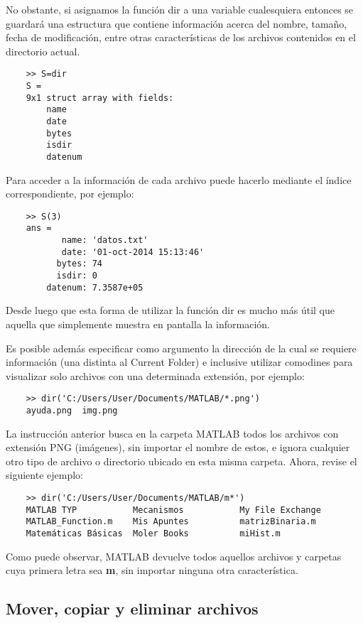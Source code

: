 No obstante, si asignamos la función dir a una variable cualesquiera entonces se 
guardará una estructura que contiene información acerca del nombre, tamaño, fecha 
de modificación, entre otras características de los archivos contenidos en el 
directorio actual.

\begin{verbatim}
	>> S=dir
	S = 
	9x1 struct array with fields:
	    name
	    date
	    bytes
	    isdir
	    datenum
\end{verbatim}

Para acceder a la información de cada archivo puede hacerlo mediante el índice 
correspondiente, por ejemplo:

\begin{verbatim}
	>> S(3)
	ans = 
	       name: 'datos.txt'
	       date: '01-oct-2014 15:13:46'
	      bytes: 74
	      isdir: 0
	    datenum: 7.3587e+05
\end{verbatim}

Desde luego que esta forma de utilizar la función dir es mucho más útil que aquella 
que simplemente muestra en pantalla la información.

Es posible además especificar como argumento la dirección de la cual se requiere 
información (una distinta al Current Folder) e inclusive utilizar comodines para 
visualizar solo archivos con una determinada extensión, por ejemplo:

\begin{verbatim}
   	>> dir('C:/Users/User/Documents/MATLAB/*.png')
	ayuda.png  img.png 
\end{verbatim}   

La instrucción anterior busca en la carpeta MATLAB todos los archivos con 
extensión PNG (imágenes), sin importar el nombre de estos, e ignora cualquier 
otro tipo de archivo o directorio ubicado en esta misma carpeta. Ahora, 
revise el siguiente ejemplo:

\begin{verbatim}
	>> dir('C:/Users/User/Documents/MATLAB/m*')
	MATLAB TYP           Mecanismos           My File Exchange     
	MATLAB_Function.m    Mis Apuntes          matrizBinaria.m      
	Matemáticas Básicas  Moler Books          miHist.m       
\end{verbatim}

Como puede observar, MATLAB devuelve todos aquellos archivos y carpetas cuya 
primera letra sea \textbf{m}, sin importar ninguna otra característica.

\subsection{Mover, copiar y eliminar archivos}

